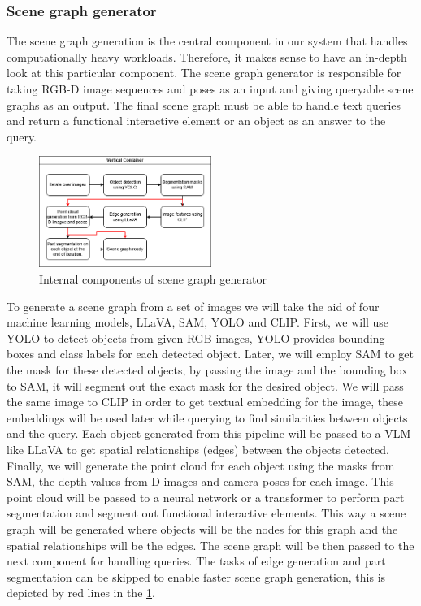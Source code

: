 \subsubsection{Scene graph generator}
The scene graph generation is the central component in our system that handles computationally heavy workloads. Therefore, it makes sense to have an 
in-depth look at this particular component. The scene graph generator is responsible for taking RGB-D image sequences and poses as an input and giving queryable scene graphs
as an output. The final scene graph must be able to handle text queries and return a functional interactive element or an object as an answer to the query. \\
\begin{figure}[ht!]
    \centering
    \includegraphics[width=0.5\textwidth]{content/images/SceneGraphGenerator.png}
    \caption{Internal components of scene graph generator}
    \label{fig:sceneGrahpGenerator}
\end{figure}
To generate a scene graph from a set of images we will take the aid of four machine learning models, LLaVA, SAM, YOLO and CLIP. First, we will use YOLO to detect 
objects from given RGB images, YOLO provides bounding boxes and class labels for each detected object. Later, we will employ SAM to get the mask for these detected 
objects, by passing the image and the bounding box to SAM, it will segment out the exact mask for the desired object. We will pass the same image to CLIP
in order to get textual embedding for the image, these embeddings will be used later while querying to find similarities between objects and the query. 
Each object generated from this pipeline will be passed to a VLM like LLaVA to get spatial relationships (edges) between the objects detected. Finally,
we will generate the point cloud for each object using the masks from SAM, the depth values from D images and camera poses for each image. This point cloud
will be passed to a neural network or a transformer to perform part segmentation and segment out functional interactive elements. This way a scene graph will be generated where objects will be
the nodes for this graph and the spatial relationships will be the edges. The scene graph will be then passed to the next component for handling queries.
The tasks of edge generation and part segmentation can be skipped to enable faster scene graph generation, 
this is depicted by red lines in the \cref{fig:sceneGrahpGenerator}.
